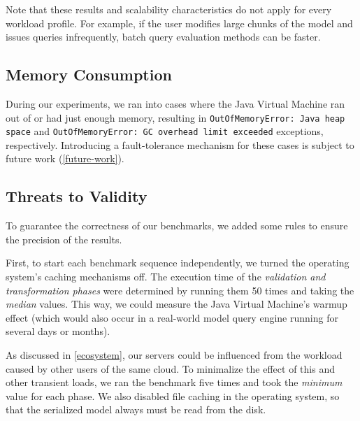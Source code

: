 Note that these results and scalability characteristics do not apply for every workload profile. For example, if the user modifies large chunks of the model and issues queries infrequently, batch query evaluation methods can be faster. 


\subsection{Memory Consumption}

During our experiments, we ran into cases where the Java Virtual Machine ran out of or had just enough memory, resulting in \texttt{OutOfMemoryError: Java heap space} and \texttt{OutOfMemoryError: GC overhead limit exceeded} exceptions, respectively. Introducing a fault-tolerance mechanism for these cases is subject to future work (\autoref{future-work}).

\subsection{Threats to Validity}
\label{threats-to-validity}

To guarantee the correctness of our benchmarks, we added some rules to ensure the precision of the results.

First, to start each benchmark sequence independently, we turned the operating system's caching mechanisms off. The execution time of the \emph{validation and transformation phases} were determined by running them 50 times and taking the \emph{median} values. This way, we could measure the Java Virtual Machine's warmup effect (which would also occur in a real-world model query engine running for several days or months).

As discussed in \autoref{ecosystem}, our servers could be influenced from the workload caused by other users of the same cloud. To minimalize the effect of this and other transient loads, we ran the benchmark five times and took the \emph{minimum} value for each phase. We also disabled file caching in the operating system, so that the serialized model always must be read from the disk.



